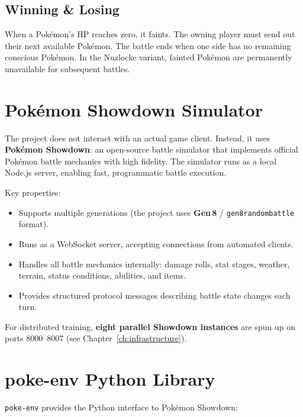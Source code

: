 
\subsection{Winning \& Losing}

When a Pok\'{e}mon's HP reaches zero, it faints.  The owning player must send
out their next available Pok\'{e}mon.  The battle ends when one side has no
remaining conscious Pok\'{e}mon.  In the Nuzlocke variant, fainted Pok\'{e}mon
are permanently unavailable for subsequent battles.

\section{Pok\'{e}mon Showdown Simulator}

The project does not interact with an actual game client.  Instead, it uses
\textbf{Pok\'{e}mon Showdown}: an open-source battle simulator that
implements official Pok\'{e}mon battle mechanics with high fidelity.  The
simulator runs as a local Node.js server, enabling fast, programmatic battle
execution.

Key properties:

\begin{itemize}
  \item Supports multiple generations (the project uses \textbf{Gen\,8} /
        \texttt{gen8randombattle} format).
  \item Runs as a WebSocket server, accepting connections from automated
        clients.
  \item Handles all battle mechanics internally: damage rolls, stat stages,
        weather, terrain, status conditions, abilities, and items.
  \item Provides structured protocol messages describing battle state changes
        each turn.
\end{itemize}

For distributed training, \textbf{eight parallel Showdown instances} are spun
up on ports 8000--8007 (see Chapter~\ref{ch:infrastructure}).

\section{poke-env Python Library}

\texttt{poke-env} provides the Python interface to Pok\'{e}mon Showdown:

